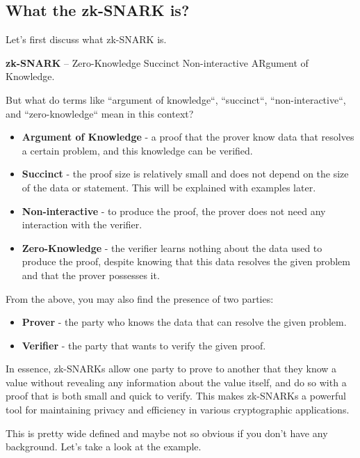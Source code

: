 \documentclass[../lecture-notes.tex]{subfiles}
\begin{document}
\subsection{What the zk-SNARK is?}

Let's first discuss what zk-SNARK is.

\begin{definition}
    \textbf{zk-SNARK} – Zero-Knowledge Succinct Non-interactive ARgument of Knowledge.
\end{definition}

But what do terms like ``argument of knowledge``, ``succinct``, ``non-interactive``, and 
``zero-knowledge`` mean in this context?

\begin{itemize}
    \item \textbf{Argument of Knowledge} - a proof that the prover know data that resolves a certain
    problem, and this knowledge can be verified.
    \item \textbf{Succinct} - the proof size is relatively small and does not depend on the size of 
    the data or statement. This will be explained with examples later.
    \item \textbf{Non-interactive} - to produce the proof, the prover does not need any interaction
    with the verifier.
    \item \textbf{Zero-Knowledge} - the verifier learns nothing about the data used to produce the
    proof, despite knowing that this data resolves the given problem and that the prover possesses it.
\end{itemize}

From the above, you may also find the presence of two parties:

\begin{itemize}
    \item \textbf{Prover} - the party who knows the data that can resolve the given problem.
    \item \textbf{Verifier} - the party that wants to verify the given proof.
\end{itemize}

In essence, zk-SNARKs allow one party to prove to another that they know a value without revealing 
any information about the value itself, and do so with a proof that is both small and quick to 
verify. This makes zk-SNARKs a powerful tool for maintaining privacy and efficiency in various 
cryptographic applications.

This is pretty wide defined and maybe not so obvious if you don't have any background. Let's take a
look at the example.
\end{document}
